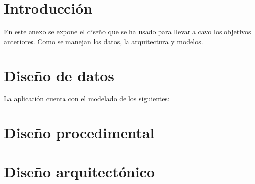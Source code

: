 
\section{Introducción}
En este anexo se expone el diseño que se ha usado para llevar a cavo los objetivos anteriores. Como se manejan los datos, la arquitectura y modelos.

\section{Diseño de datos}
La aplicación cuenta con el modelado de los siguientes:

\begin{itemize}

\end{itemize}


\section{Diseño procedimental}

\section{Diseño arquitectónico}


